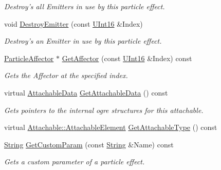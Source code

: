 \begin{DoxyCompactItemize}
\begin{DoxyCompactList}\small\item\em Destroy's all Emitters in use by this particle effect. \item\end{DoxyCompactList}\item 
void \hyperlink{classMezzanine_1_1ParticleEffect_a00195054c7c949038a083be943876e28}{DestroyEmitter} (const \hyperlink{namespaceMezzanine_a1b6c09063432c7ddd87011c88306c767}{UInt16} \&Index)
\begin{DoxyCompactList}\small\item\em Destroy's an Emitter in use by this particle effect. \item\end{DoxyCompactList}\item 
\hyperlink{classMezzanine_1_1ParticleAffector}{ParticleAffector} $\ast$ \hyperlink{classMezzanine_1_1ParticleEffect_a401836904a0426be484bcecb33447b6c}{GetAffector} (const \hyperlink{namespaceMezzanine_a1b6c09063432c7ddd87011c88306c767}{UInt16} \&Index) const 
\begin{DoxyCompactList}\small\item\em Gets the Affector at the specified index. \item\end{DoxyCompactList}\item 
virtual \hyperlink{structMezzanine_1_1AttachableData}{AttachableData} \hyperlink{classMezzanine_1_1ParticleEffect_afd4e4d0917450000348abe394c07e985}{GetAttachableData} () const 
\begin{DoxyCompactList}\small\item\em Gets pointers to the internal ogre structures for this attachable. \item\end{DoxyCompactList}\item 
virtual \hyperlink{classMezzanine_1_1Attachable_a274bd45f9666f6e50f6fdd8a0162bc9e}{Attachable::AttachableElement} \hyperlink{classMezzanine_1_1ParticleEffect_aa9beb1bdcebf98dd3ddced6a7310ed7b}{GetAttachableType} () const 
\item 
\hyperlink{namespaceMezzanine_acf9fcc130e6ebf08e3d8491aebcf1c86}{String} \hyperlink{classMezzanine_1_1ParticleEffect_adce2efc1c8e866459db8438454483dc4}{GetCustomParam} (const \hyperlink{namespaceMezzanine_acf9fcc130e6ebf08e3d8491aebcf1c86}{String} \&Name) const 
\begin{DoxyCompactList}\small\item\em Gets a custom parameter of a particle effect. \item\end{DoxyCompactList}\item 

\end{DoxyCompactItemize}
